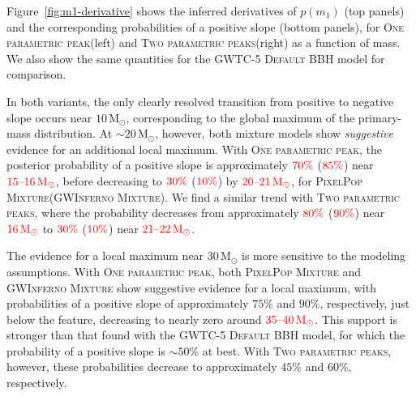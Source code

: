 \documentclass[twocolumn,twocolappendix,linenumbers]{aastex631}
\newcommand{\PPMixture}{\textsc{PixelPop Mixture}\xspace}
\newcommand{\GwinfMixture}{\textsc{GWInferno Mixture}\xspace}
\newcommand{\oneparpeak}{\textsc{One parametric peak}\xspace}
\newcommand{\twoparpeaks}{\textsc{Two parametric peaks}\xspace}
\newcommand{\Msun}{\ensuremath{\mathrm{M}_\odot}\xspace}
\begin{document}
Figure~\ref{fig:m1-derivative} shows the inferred derivatives of $p(m_1)$ (top panels) and the corresponding probabilities of a positive slope (bottom panels), for \oneparpeak (left) and \twoparpeaks (right) as a function of mass. We also show the same quantities for the \ac{GWTC-5} \textsc{Default} \ac{BBH} model for comparison.

In both variants, the only clearly resolved transition from positive to negative slope occurs near $10\,\Msun$, corresponding to the global maximum of the primary-mass distribution. 
At $\sim20\,\Msun$, however, both mixture models show \emph{suggestive} evidence for an additional local maximum. 
With \oneparpeak, the posterior probability of a positive slope is approximately $\textcolor{red}{70\%}$ ($\textcolor{red}{85\%}$) near $\textcolor{red}{15\text{--}16\,\Msun}$, before decreasing to $\textcolor{red}{30\%}$ ($\textcolor{red}{10\%}$) by $\textcolor{red}{20\text{--}21\,\Msun}$, for \PPMixture (\GwinfMixture).
We find a similar trend with \twoparpeaks, where the probability decreases from approximately $\textcolor{red}{80\%}$ ($\textcolor{red}{90\%}$) near $\textcolor{red}{16\,\Msun}$ to $\textcolor{red}{30\%}$ ($\textcolor{red}{10\%}$) near $\textcolor{red}{21\text{--}22\,\Msun}$. 


The evidence for a local maximum near $30\,\Msun$ is more sensitive to the modeling assumptions. With \oneparpeak, both \PPMixture and \GwinfMixture show suggestive evidence for a local maximum, with probabilities of a positive slope of approximately $75\%$ and $90\%$, respectively, just below the feature, decreasing to nearly zero around $\textcolor{red}{35\text{--}40\,\Msun}$. This support is stronger than that found with the \ac{GWTC-5} \textsc{Default} \ac{BBH} model, for which the probability of a positive slope is $\sim50\%$ at best. With \twoparpeaks, however, these probabilities decrease to approximately $45\%$ and $60\%$, respectively.
\end{document}
